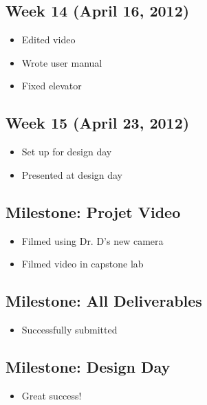 \documentclass[11pt,a4paper,oneside]{article}
\begin{document}
\subsection{Week 14 (April 16, 2012)}
\begin{itemize}
\item Edited video
\item Wrote user manual
\item Fixed elevator
\end{itemize}

\subsection{Week 15 (April 23, 2012)}
\begin{itemize}
\item Set up for design day
\item Presented at design day
\end{itemize}

\subsection{Milestone: Projet Video}
\begin{itemize}
\item Filmed using Dr. D's new camera
\item Filmed video in capstone lab
\end{itemize}

\subsection{Milestone: All Deliverables}
\begin{itemize}
\item Successfully submitted
\end{itemize}

\subsection{Milestone: Design Day}
\begin{itemize}
\item Great success!
\end{itemize}




\end{document}
